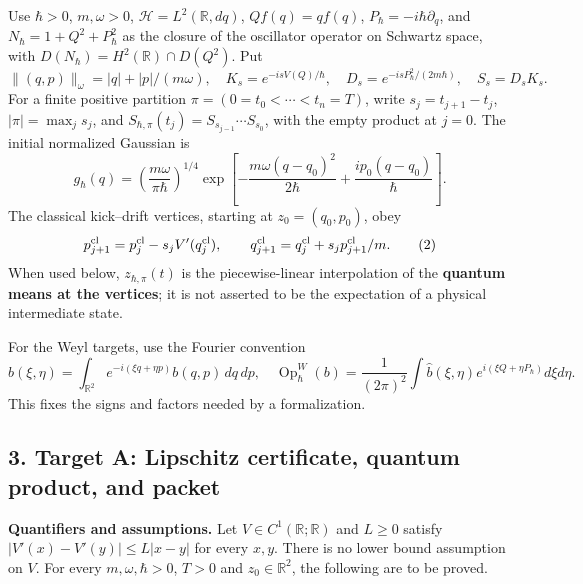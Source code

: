 \documentclass[11pt,a4paper]{article}
\begin{document}
Use \(\hbar>0\), \(m,\omega>0\), \(\mathcal H=L^2(\mathbb R,dq)\),
\(Qf(q)=qf(q)\), \(P_\hbar=-i\hbar\partial_q\), and
\(N_\hbar=1+Q^2+P_\hbar^2\) as the closure of the oscillator operator on
Schwartz space, with \(D(N_\hbar)=H^2(\mathbb R)\cap D(Q^2)\). Put \[
 \|(q,p)\|_\omega=|q|+|p|/(m\omega),\quad
 K_s=e^{-isV(Q)/\hbar},\quad
 D_s=e^{-isP_\hbar^2/(2m\hbar)},\quad S_s=D_sK_s.
\] For a finite positive partition \(\pi=(0=t_0<\cdots<t_n=T)\), write
\(s_j=t_{j+1}-t_j\), \(|\pi|=\max_j s_j\), and
\(S_{\hbar,\pi}(t_j)=S_{s_{j-1}}\cdots S_{s_0}\), with the empty product
at \(j=0\). The initial normalized Gaussian is \[
 g_\hbar(q)=\left(\frac{m\omega}{\pi\hbar}\right)^{1/4}
 \exp\!\left[-\frac{m\omega(q-q_0)^2}{2\hbar}
             +\frac{ip_0(q-q_0)}{\hbar}\right]. \tag{1}
\] The classical kick--drift vertices, starting at \(z_0=(q_0,p_0)\),
obey \[p^{\rm cl}_{j+1}=p^{\rm cl}_j-s_jV'(q^{\rm cl}_j),\qquad
q^{\rm cl}_{j+1}=q^{\rm cl}_j+s_jp^{\rm cl}_{j+1}/m. \tag{2}\] When used
below, \(z_{\hbar,\pi}(t)\) is the piecewise-linear interpolation of the
\textbf{quantum means at the vertices}; it is not asserted to be the
expectation of a physical intermediate state.

For the Weyl targets, use the Fourier convention \[
 \widehat b(\xi,\eta)=\int_{\mathbb R^2}
       e^{-i(\xi q+\eta p)}b(q,p)\,dq\,dp,\quad
 \operatorname{Op}^W_\hbar(b)=\frac1{(2\pi)^2}
       \int\widehat b(\xi,\eta)e^{i(\xi Q+\eta P_\hbar)}d\xi d\eta.
 \tag{3}
\] This fixes the signs and factors needed by a formalization.

\hypertarget{target-a-lipschitz-certificate-quantum-product-and-packet}{%
\subsection{3. Target A: Lipschitz certificate, quantum product, and
packet}\label{target-a-lipschitz-certificate-quantum-product-and-packet}}

\textbf{Quantifiers and assumptions.} Let
\(V\in C^1(\mathbb R;\mathbb R)\) and \(L\ge0\) satisfy
\(|V'(x)-V'(y)|\le L|x-y|\) for every \(x,y\). There is no lower bound
assumption on \(V\). For every \(m,\omega,\hbar>0\), \(T>0\) and
\(z_0\in\mathbb R^2\), the following are to be proved.
\end{document}
